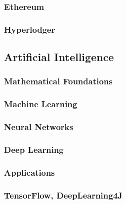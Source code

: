 \documentclass[11pt, twocolumn]{article}
\begin{document}
\subsubsection{Ethereum}

\subsubsection{Hyperlodger}

\subsection{Artificial Intelligence}

\subsubsection{Mathematical Foundations}

\subsubsection{Machine Learning}

\subsubsection{Neural Networks}

\subsubsection{Deep Learning}

\subsubsection{Applications}

\subsubsection{TensorFlow, DeepLearning4J}
\end{document}
